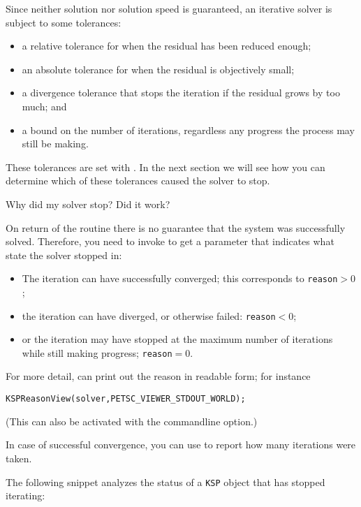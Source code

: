 Since neither
solution nor solution speed is guaranteed, an iterative solver is
subject to some tolerances:
\begin{itemize}
\item a relative tolerance for when the residual has been reduced
  enough;
\item an absolute tolerance for when the residual is objectively
  small;
\item a divergence tolerance that stops the iteration if the residual
  grows by too much; and
\item a bound on the number of iterations, regardless any progress the
  process may still be making.
\end{itemize}

These tolerances are set with .
In the next section we will see how you can determine which of these tolerances
caused the solver to stop.

 {Why did my solver stop? Did it work?}
\label{sec:ksp-reason}

On return of the  routine there is no guarantee
that the system was successfully solved.
Therefore, you need to invoke
to get a  parameter that indicates
what state the solver stopped in:
\begin{itemize}
\item The iteration can have successfully converged; this corresponds
  to \lstinline{reason}$>0$;
\item the iteration can have diverged, or otherwise failed: \lstinline{reason}$<0$;
\item or the iteration may have stopped at the maximum number of
  iterations while still making progress; \lstinline{reason}$=0$.
\end{itemize}
For more detail,  can print out the
reason in readable form; for instance
\begin{lstlisting}
KSPReasonView(solver,PETSC_VIEWER_STDOUT_WORLD);
\end{lstlisting}
(This can also be activated with the 
commandline option.)

In case of successful convergence, you can use 
to report how many
iterations were taken.

The following snippet analyzes the status of a \lstinline{KSP} object
that has stopped iterating:
%

